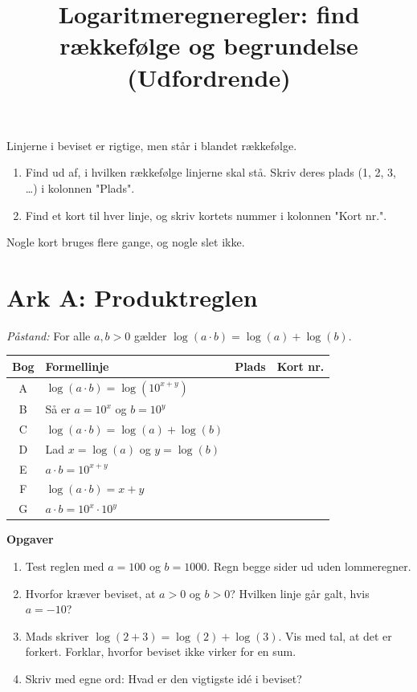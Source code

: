 \documentclass[a4paper,11pt]{article}
\date{}
\title{Logaritmeregneregler: find rækkefølge og begrundelse (Udfordrende)}
\begin{document}
\maketitle
Linjerne i beviset er rigtige, men står i blandet rækkefølge.
\begin{enumerate}
\item Find ud af, i hvilken rækkefølge linjerne skal stå. Skriv deres plads (1, 2, 3, \ldots{}) i kolonnen "Plads".
\item Find et kort til hver linje, og skriv kortets nummer i kolonnen "Kort nr.".
\end{enumerate}

Nogle kort bruges flere gange, og nogle slet ikke.

\newpage
\section*{Ark A: Produktreglen}
\label{sec:orga873b1a}

\emph{Påstand:} For alle \(a,b>0\) gælder \(\log(a\cdot b)=\log(a)+\log(b)\).

\begin{center}
\begin{tabular}{|c|l|c|p{2.5cm}|}
\hline
Bog & Formellinje & Plads & Kort nr.\\
\hline
A & \(\log(a\cdot b)=\log(10^{x+y})\) &  & \\
B & Så er \(a=10^x\) og \(b=10^y\) &  & \\
C & \(\log(a\cdot b)=\log(a)+\log(b)\) &  & \\
D & Lad \(x=\log(a)\) og \(y=\log(b)\) &  & \\
E & \(a\cdot b=10^{x+y}\) &  & \\
F & \(\log(a\cdot b)=x+y\) &  & \\
G & \(a\cdot b=10^x\cdot 10^y\) &  & \\
\hline
\end{tabular}
\end{center}

\textbf{Opgaver}
\begin{enumerate}
\item Test reglen med \(a=100\) og \(b=1000\). Regn begge sider ud uden lommeregner.
\item Hvorfor kræver beviset, at \(a>0\) og \(b>0\)? Hvilken linje går galt, hvis \(a=-10\)?
\item Mads skriver \(\log(2+3)=\log(2)+\log(3)\). Vis med tal, at det er forkert. Forklar, hvorfor beviset ikke virker for en sum.
\item Skriv med egne ord: Hvad er den vigtigste idé i beviset?
\end{enumerate}
\end{document}
